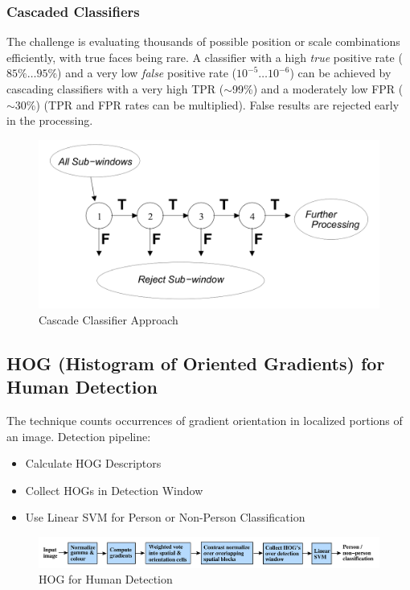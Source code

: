 \subsubsection{Cascaded Classifiers}
The challenge is evaluating thousands of possible position or scale combinations efficiently, with true faces being rare.
A classifier with a high \emph{true} positive rate ($85\%\ldots95\%$) and a very low \emph{false} positive rate ($10^{-5}\ldots10^{-6}$)
can be achieved by cascading classifiers with a very high TPR ($\sim$99\%) and a moderately low FPR ($\sim$30\%) (TPR and FPR rates can be multiplied).
False results are rejected early in the processing.

\begin{figure}[h]
	\centering
	\includegraphics[width=0.6\linewidth]{img/cascade_classifier_approach}
	\caption{Cascade Classifier Approach}
\end{figure}

\subsection{HOG (Histogram of Oriented Gradients) for Human Detection}
The technique counts occurrences of gradient orientation in localized portions of an image.
Detection pipeline:
\begin{itemize}
	\item Calculate HOG Descriptors
	\item Collect HOGs in Detection Window
	\item Use Linear SVM for Person or Non-Person Classification
\end{itemize}

\begin{figure}[h]
	\centering
	\includegraphics[width=0.8\linewidth]{img/hog_human_detection}
	\caption{HOG for Human Detection}
\end{figure}

